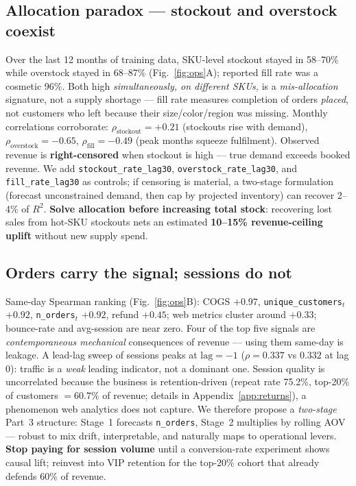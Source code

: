 \documentclass{article}
\newcommand{\keyfact}[1]{\textcolor{accent}{\textbf{#1}}}
\newcommand{\lever}[1]{\textcolor{warn}{\textbf{#1}}}
\begin{document}
\subsection{Allocation paradox --- stockout and overstock coexist}
\label{sec:f5}
Over the last 12 months of training data, SKU-level stockout stayed in 58--70\% while overstock stayed in 68--87\% (Fig.~\ref{fig:ops}A); reported fill rate was a cosmetic 96\%. Both high \emph{simultaneously, on different SKUs,} is a \emph{mis-allocation} signature, not a supply shortage --- fill rate measures completion of orders \emph{placed}, not customers who left because their size/color/region was missing. Monthly correlations corroborate: $\rho_{\text{stockout}}{=}{+}0.21$ (stockouts rise with demand), $\rho_{\text{overstock}}{=}{-}0.65$, $\rho_{\text{fill}}{=}{-}0.49$ (peak months squeeze fulfilment). Observed revenue is \keyfact{right-censored} when stockout is high --- true demand exceeds booked revenue. We add \texttt{stockout\_rate\_lag30}, \texttt{overstock\_rate\_lag30}, and \texttt{fill\_rate\_lag30} as controls; if censoring is material, a two-stage formulation (forecast unconstrained demand, then cap by projected inventory) can recover 2--4\% of $R^2$. \lever{Solve allocation before increasing total stock}: recovering lost sales from hot-SKU stockouts nets an estimated \keyfact{10--15\% revenue-ceiling uplift} without new supply spend.

\vspace{-4pt}
\subsection{Orders carry the signal; sessions do not}
\label{sec:f6}
Same-day Spearman ranking (Fig.~\ref{fig:ops}B): COGS $+0.97$, \texttt{unique\_customers}$_t$ $+0.92$, \texttt{n\_orders}$_t$ $+0.92$, refund $+0.45$; web metrics cluster around $+0.33$; bounce-rate and avg-session are near zero. Four of the top five signals are \emph{contemporaneous mechanical} consequences of revenue --- using them same-day is leakage. A lead-lag sweep of sessions peaks at $\text{lag}=-1$ ($\rho=0.337$ vs $0.332$ at lag 0): traffic is a \emph{weak} leading indicator, not a dominant one. Session quality is uncorrelated because the business is retention-driven (repeat rate 75.2\%, top-20\% of customers $=60.7\%$ of revenue; details in Appendix~\ref{app:returns}), a phenomenon web analytics does not capture. We therefore propose a \emph{two-stage} Part~3 structure: Stage~1 forecasts \texttt{n\_orders}, Stage~2 multiplies by rolling AOV --- robust to mix drift, interpretable, and naturally maps to operational levers. \lever{Stop paying for session volume} until a conversion-rate experiment shows causal lift; reinvest into VIP retention for the top-20\% cohort that already defends 60\% of revenue.
\end{document}
